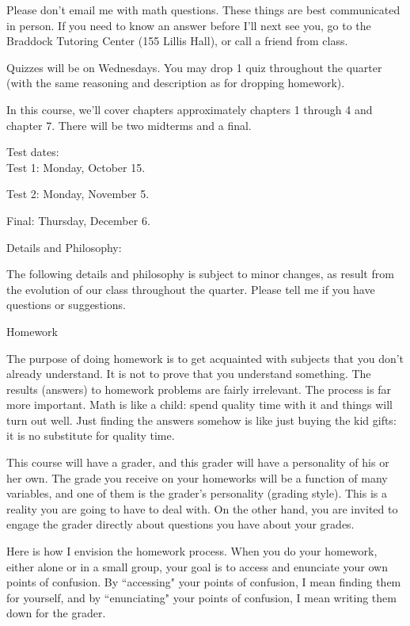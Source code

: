 \documentclass[12pt]{letter}
\begin{document}
Please don't email me with math questions.  These things are best 
communicated in person.  If you need to know an answer before I'll next 
see you, go to the Braddock Tutoring Center (155 Lillis Hall), or call a 
friend from class.

Quizzes will be on Wednesdays.  You may drop 1 quiz throughout the quarter 
(with the same reasoning and description as for dropping homework).

In this course, we'll cover chapters approximately chapters 1 through 4 
and chapter 7.  There will be two midterms and a final.

Test dates:\\

Test 1: Monday, October 15.

Test 2: Monday, November 5.

Final: Thursday, December 6.

\vspace{.2in}

\Large Details and Philosophy:\normalsize

The following details and philosophy is subject to minor changes, 
as result from the evolution of our class throughout the quarter.  Please 
tell me if you have questions or suggestions.  

\large Homework\normalsize 

The purpose of doing homework is to get acquainted with subjects that you 
don't already understand.  It is not to prove that you understand 
something.  The results (answers) to homework problems are fairly 
irrelevant.  The process is far more important.  Math is like a child: 
spend quality time with it and things will turn out well.  Just finding 
the answers somehow is like just buying the kid gifts: it is no substitute 
for quality time.

This course will have a grader, and this grader will have a personality of 
his or her own.  The grade you receive on your homeworks will be a 
function of many variables, and one of them is the grader's personality 
(grading style).  This is a reality you are going to have to deal with.  
On the other hand, you are invited to engage the grader directly about 
questions you have about your grades.

Here is how I envision the homework process.  When you do your homework, 
either alone or in a small group, your goal is to access and enunciate 
your own points of confusion.  By ``accessing" your points of confusion, I 
mean finding them for yourself, and by ``enunciating" your points of 
confusion, I mean writing them down for the grader.  
\end{document}
